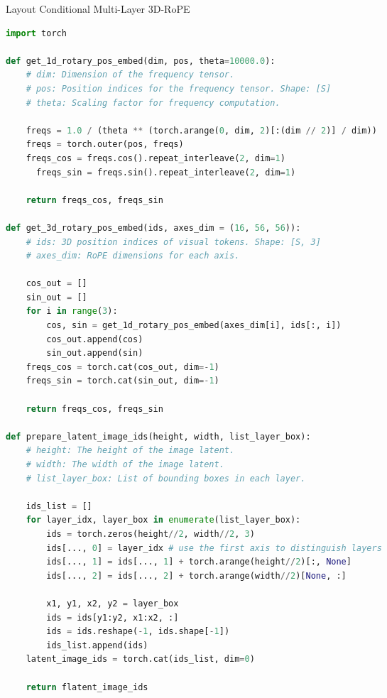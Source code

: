 \onecolumn

\begin{minipage}[b]{1\columnwidth}
\begin{algorithm}[H]
\SetAlgoLined
\caption{Layout Conditional Multi-Layer 3D-RoPE}
\label{algo:3drope_1}
\tiny
\begin{lstlisting}[language=Python]
import torch

def get_1d_rotary_pos_embed(dim, pos, theta=10000.0):
    # dim: Dimension of the frequency tensor.
    # pos: Position indices for the frequency tensor. Shape: [S]
    # theta: Scaling factor for frequency computation.

    freqs = 1.0 / (theta ** (torch.arange(0, dim, 2)[:(dim // 2)] / dim))
    freqs = torch.outer(pos, freqs)
    freqs_cos = freqs.cos().repeat_interleave(2, dim=1)
      freqs_sin = freqs.sin().repeat_interleave(2, dim=1)
    
    return freqs_cos, freqs_sin

def get_3d_rotary_pos_embed(ids, axes_dim = (16, 56, 56)):
    # ids: 3D position indices of visual tokens. Shape: [S, 3]
    # axes_dim: RoPE dimensions for each axis.

    cos_out = []
    sin_out = []
    for i in range(3):
        cos, sin = get_1d_rotary_pos_embed(axes_dim[i], ids[:, i])
        cos_out.append(cos)
        sin_out.append(sin)
    freqs_cos = torch.cat(cos_out, dim=-1)
    freqs_sin = torch.cat(sin_out, dim=-1)

    return freqs_cos, freqs_sin
    
def prepare_latent_image_ids(height, width, list_layer_box):
    # height: The height of the image latent.
    # width: The width of the image latent.
    # list_layer_box: List of bounding boxes in each layer. 

    ids_list = []
    for layer_idx, layer_box in enumerate(list_layer_box):
        ids = torch.zeros(height//2, width//2, 3)
        ids[..., 0] = layer_idx # use the first axis to distinguish layers
        ids[..., 1] = ids[..., 1] + torch.arange(height//2)[:, None]
        ids[..., 2] = ids[..., 2] + torch.arange(width//2)[None, :]

        x1, y1, x2, y2 = layer_box
        ids = ids[y1:y2, x1:x2, :]
        ids = ids.reshape(-1, ids.shape[-1])
        ids_list.append(ids)
    latent_image_ids = torch.cat(ids_list, dim=0)

    return flatent_image_ids

\end{lstlisting}
\end{algorithm}
\end{minipage}

